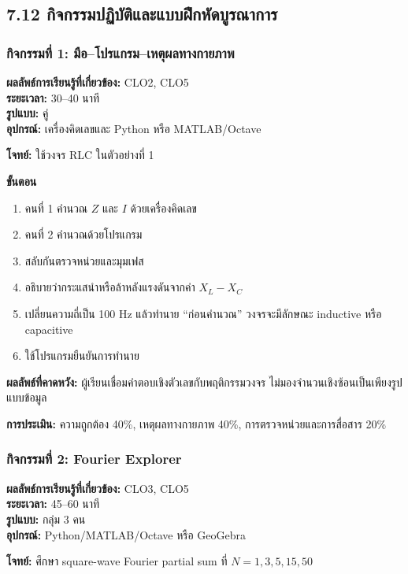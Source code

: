 \subsection{7.12 กิจกรรมปฏิบัติและแบบฝึกหัดบูรณาการ}

\subsubsection{กิจกรรมที่ 1: มือ–โปรแกรม–เหตุผลทางกายภาพ}

\textbf{ผลลัพธ์การเรียนรู้ที่เกี่ยวข้อง:} CLO2, CLO5 \\
\textbf{ระยะเวลา:} 30–40 นาที \\
\textbf{รูปแบบ:} คู่ \\
\textbf{อุปกรณ์:} เครื่องคิดเลขและ Python หรือ MATLAB/Octave

\textbf{โจทย์:} ใช้วงจร RLC ในตัวอย่างที่ 1

\textbf{ขั้นตอน}

\begin{enumerate}
    \item คนที่ 1 คำนวณ $Z$ และ $I$ ด้วยเครื่องคิดเลข
    \item คนที่ 2 คำนวณด้วยโปรแกรม
    \item สลับกันตรวจหน่วยและมุมเฟส
    \item อธิบายว่ากระแสนำหรือล้าหลังแรงดันจากค่า $X_L-X_C$
    \item เปลี่ยนความถี่เป็น 100 Hz แล้วทำนาย “ก่อนคำนวณ” วงจรจะมีลักษณะ inductive หรือ capacitive
    \item ใช้โปรแกรมยืนยันการทำนาย
\end{enumerate}

\textbf{ผลลัพธ์ที่คาดหวัง:} ผู้เรียนเชื่อมคำตอบเชิงตัวเลขกับพฤติกรรมวงจร ไม่มองจำนวนเชิงซ้อนเป็นเพียงรูปแบบข้อมูล

\textbf{การประเมิน:} ความถูกต้อง 40\%, เหตุผลทางกายภาพ 40\%, การตรวจหน่วยและการสื่อสาร 20\%

\subsubsection{กิจกรรมที่ 2: Fourier Explorer}

\textbf{ผลลัพธ์การเรียนรู้ที่เกี่ยวข้อง:} CLO3, CLO5 \\
\textbf{ระยะเวลา:} 45–60 นาที \\
\textbf{รูปแบบ:} กลุ่ม 3 คน \\
\textbf{อุปกรณ์:} Python/MATLAB/Octave หรือ GeoGebra

\textbf{โจทย์:} ศึกษา square-wave Fourier partial sum ที่ $N=1,3,5,15,50$

